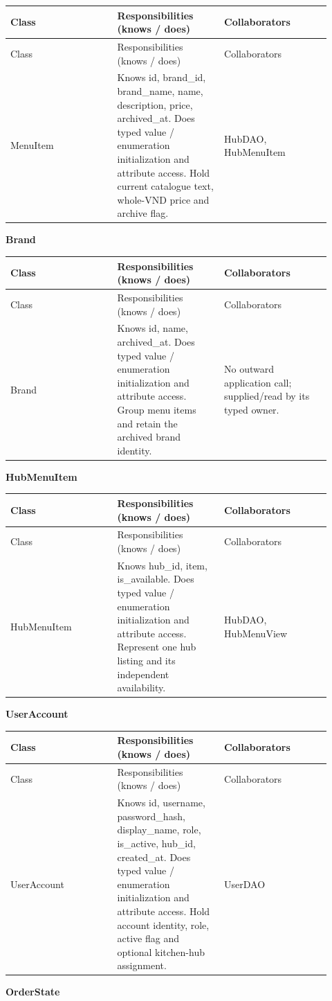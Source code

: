 \begin{longtable}{>{\raggedright\arraybackslash}p{0.3067\linewidth}>{\raggedright\arraybackslash}p{0.3067\linewidth}>{\raggedright\arraybackslash}p{0.3067\linewidth}}
Class & Responsibilities (knows / does) & Collaborators \\
\hline\endfirsthead
Class & Responsibilities (knows / does) & Collaborators \\
\hline\endhead
MenuItem & Knows id, brand\_id, brand\_name, name, description, price, archived\_at. Does typed value / enumeration initialization and attribute access. Hold current catalogue text, whole-VND price and archive flag. & HubDAO, HubMenuItem \\
\end{longtable}
\textbf{Brand}

\begin{longtable}{>{\raggedright\arraybackslash}p{0.3067\linewidth}>{\raggedright\arraybackslash}p{0.3067\linewidth}>{\raggedright\arraybackslash}p{0.3067\linewidth}}
Class & Responsibilities (knows / does) & Collaborators \\
\hline\endfirsthead
Class & Responsibilities (knows / does) & Collaborators \\
\hline\endhead
Brand & Knows id, name, archived\_at. Does typed value / enumeration initialization and attribute access. Group menu items and retain the archived brand identity. & No outward application call; supplied/read by its typed owner. \\
\end{longtable}
\textbf{HubMenuItem}

\begin{longtable}{>{\raggedright\arraybackslash}p{0.3067\linewidth}>{\raggedright\arraybackslash}p{0.3067\linewidth}>{\raggedright\arraybackslash}p{0.3067\linewidth}}
Class & Responsibilities (knows / does) & Collaborators \\
\hline\endfirsthead
Class & Responsibilities (knows / does) & Collaborators \\
\hline\endhead
HubMenuItem & Knows hub\_id, item, is\_available. Does typed value / enumeration initialization and attribute access. Represent one hub listing and its independent availability. & HubDAO, HubMenuView \\
\end{longtable}
\textbf{UserAccount}

\begin{longtable}{>{\raggedright\arraybackslash}p{0.3067\linewidth}>{\raggedright\arraybackslash}p{0.3067\linewidth}>{\raggedright\arraybackslash}p{0.3067\linewidth}}
Class & Responsibilities (knows / does) & Collaborators \\
\hline\endfirsthead
Class & Responsibilities (knows / does) & Collaborators \\
\hline\endhead
UserAccount & Knows id, username, password\_hash, display\_name, role, is\_active, hub\_id, created\_at. Does typed value / enumeration initialization and attribute access. Hold account identity, role, active flag and optional kitchen-hub assignment. & UserDAO \\
\end{longtable}
\textbf{OrderState}

